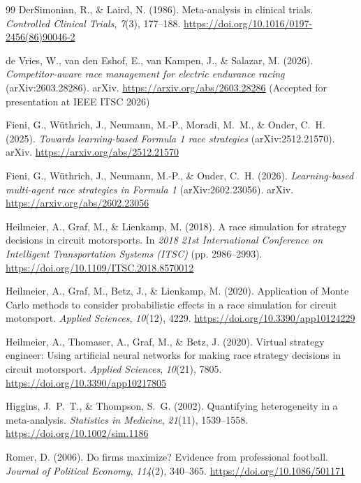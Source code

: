 \documentclass[11pt,a4paper]{article}
\begin{document}
\begin{thebibliography}{99}
DerSimonian, R., \& Laird, N. (1986). Meta-analysis in clinical trials.
\emph{Controlled Clinical Trials}, \emph{7}(3), 177--188.
\url{https://doi.org/10.1016/0197-2456(86)90046-2}

de Vries, W., van den Eshof, E., van Kampen, J., \& Salazar, M. (2026).
\emph{Competitor-aware race management for electric endurance racing}
(arXiv:2603.28286). arXiv. \url{https://arxiv.org/abs/2603.28286} (Accepted for
presentation at IEEE ITSC 2026)

Fieni, G., W\"uthrich, J., Neumann, M.-P., Moradi, M.~M., \& Onder, C.~H.
(2025). \emph{Towards learning-based Formula 1 race strategies}
(arXiv:2512.21570). arXiv. \url{https://arxiv.org/abs/2512.21570}

Fieni, G., W\"uthrich, J., Neumann, M.-P., \& Onder, C.~H. (2026).
\emph{Learning-based multi-agent race strategies in Formula 1}
(arXiv:2602.23056). arXiv. \url{https://arxiv.org/abs/2602.23056}

Heilmeier, A., Graf, M., \& Lienkamp, M. (2018). A race simulation for strategy
decisions in circuit motorsports. In \emph{2018 21st International Conference
on Intelligent Transportation Systems (ITSC)} (pp. 2986--2993).
\url{https://doi.org/10.1109/ITSC.2018.8570012}

Heilmeier, A., Graf, M., Betz, J., \& Lienkamp, M. (2020). Application of Monte
Carlo methods to consider probabilistic effects in a race simulation for
circuit motorsport. \emph{Applied Sciences}, \emph{10}(12), 4229.
\url{https://doi.org/10.3390/app10124229}

Heilmeier, A., Thomaser, A., Graf, M., \& Betz, J. (2020). Virtual strategy
engineer: Using artificial neural networks for making race strategy decisions
in circuit motorsport. \emph{Applied Sciences}, \emph{10}(21), 7805.
\url{https://doi.org/10.3390/app10217805}

Higgins, J.~P.~T., \& Thompson, S.~G. (2002). Quantifying heterogeneity in a
meta-analysis. \emph{Statistics in Medicine}, \emph{21}(11), 1539--1558.
\url{https://doi.org/10.1002/sim.1186}

Romer, D. (2006). Do firms maximize? Evidence from professional football.
\emph{Journal of Political Economy}, \emph{114}(2), 340--365.
\url{https://doi.org/10.1086/501171}


\end{thebibliography}
\end{document}
